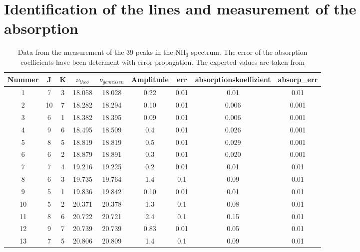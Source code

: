 \appendix

\section{Identification of the lines and measurement of the absorption}

\begin{table}[H]
\centering
\caption{Data from the measurement of the 39 peaks in the NH$_3$ spectrum. The error of the absorption coefficients have been determent with error propagation. The experted values are taken from \cite{examenarbeit}}
\label{tab:data_39_1}
\begin{tabular}{c|c|c|c|c|c|c|c|c}
 Nummer &   J &   K &  $\nu_{theo}$ &  $\nu_{gemessen}$ &  Amplitude &   err &  absorptionskoeffizient &  absorp\_err \\ \hline
      1 &   7 &   3 &   18.058 &       18.028 &      0.22 &  0.01 &                0.01 &    0.01 \\
      2 &  10 &   7 &   18.282 &       18.294 &      0.10 &  0.01 &                0.006 &    0.001 \\
      3 &   6 &   1 &   18.382 &       18.395 &      0.09 &  0.01 &                0.006 &    0.001 \\
      4 &   9 &   6 &   18.495 &       18.509 &      0.4 &  0.01 &                0.026 &    0.001 \\
      5 &   8 &   5 &   18.819 &       18.819 &      0.5 &  0.01 &                0.029 &    0.001 \\
      6 &   6 &   2 &   18.879 &       18.891 &      0.3 &  0.01 &                0.020 &    0.001 \\
      7 &   7 &   4 &   19.216 &       19.225 &      0.2 &  0.01 &                0.01 &    0.01 \\
      8 &   6 &   3 &   19.735 &       19.764 &      1.4 &  0.1 &                0.09 &    0.01 \\
      9 &   5 &   1 &   19.836 &       19.842 &      0.10 &  0.01 &                0.01 &    0.01 \\
     10 &   5 &   2 &   20.371 &       20.378 &      1.3 &  0.1 &                0.08 &    0.01 \\
     11 &   8 &   6 &   20.722 &       20.721 &      2.4 &  0.1 &                0.15 &    0.01 \\
     12 &   9 &   7 &   20.739 &       20.739 &      0.83 &  0.01 &                0.05 &    0.01 \\
     13 &   7 &   5 &   20.806 &       20.809 &      1.4 &  0.1 &                0.09 &    0.01 \\

\end{tabular}
\end{table}
